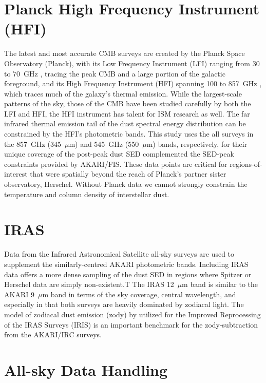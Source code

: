 \section{Planck High Frequency Instrument (HFI)}
     The latest and most accurate CMB surveys are created by the Planck Space Observatory (Planck), with its Low Frequency Instrument (LFI)  ranging from 30 to 70~GHz \citep{lfi14ii}, tracing the peak CMB and a large portion of the galactic foreground, and its High Frequency Instrument (HFI) spanning 100 to 857~GHz \citep{hfi14viii}, which traces much of the galaxy’s thermal emission.
     While the largest-scale patterns of the sky, those of the CMB have been studied carefully by both the LFI and HFI, the HFI instrument has talent for ISM research as well. The far infrared thermal emission tail of the dust spectral energy distribution can be constrained by the HFI’s photometric bands. This study uses the all surveys in the 857~GHz (345~$\mu$m) and 545~GHz (550~$\mu$m) bands, respectively, for their unique coverage of the post-peak dust SED complemented the SED-peak constraints provided by AKARI/FIS. These data points are critical for regions-of-interest that were spatially beyond the reach of Planck’s partner sister observatory, Herschel. Without Planck data we cannot strongly constrain the temperature and column density of interstellar dust.
\section{IRAS}
     Data from the Infrared Astronomical Satellite \citep{iras84} all-sky surveys are used to supplement the similarly-centred AKARI photometric bands. Including IRAS data offers a more dense sampling of the dust SED in regions where Spitzer or Herschel data are simply non-existent.T
     The IRAS 12~$\mu$m band is similar to the AKARI 9~$\mu$m band in terms of the sky coverage, central wavelength, and especially in that both surveys are heavily dominated by zodiacal light. The model of zodiacal dust emission (zody) by \cite{mrr13} utilized for the Improved Reprocessing of the IRAS Surveys (IRIS) \citep{iris05} is an important benchmark for the zody-subtraction from the AKARI/IRC surveys.
\section{All-sky Data Handling}
